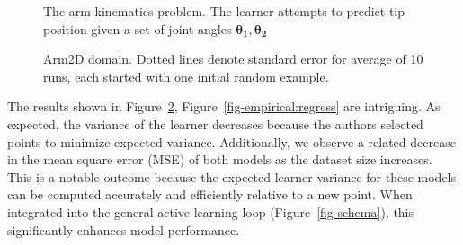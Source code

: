 \documentclass[
  letterpaper,
  numbers=noenddot,
  DIV=11]{scrreprt}
\theoremstyle{definition}
\theoremstyle{plain}
\theoremstyle{plain}
\theoremstyle{remark}
\begin{document}
\begin{figure}


\caption{\label{fig-arm2D}The arm kinematics problem. The learner
attempts to predict tip position given a set of joint angles
\(\mathbf{\theta_1}, \mathbf{\theta_2}\)}

\end{figure}%

\begin{figure}


\caption{\label{fig-empirical:gauss}Arm2D domain. Dotted lines denote
standard error for average of 10 runs, each started with one initial
random example.}

\end{figure}%

The results shown in
Figure~\ref{fig-empirical:gauss}, Figure~\ref{fig-empirical:regress} are
intriguing. As expected, the variance of the learner decreases because
the authors selected points to minimize expected variance. Additionally,
we observe a related decrease in the mean square error (MSE) of both
models as the dataset size increases. This is a notable outcome because
the expected learner variance for these models can be computed
accurately and efficiently relative to a new point. When integrated into
the general active learning loop (Figure~\ref{fig-schema}), this
significantly enhances model performance.
\end{document}
